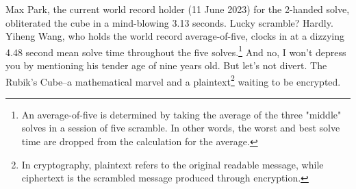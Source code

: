 \documentclass[12pt]{article}
\begin{document}
Max Park, the current world record holder (11 June 2023) for the 2-handed solve, obliterated the cube in a mind-blowing 3.13 seconds. Lucky scramble? Hardly. Yiheng Wang, who holds the world record average-of-five, clocks in at a dizzying 4.48 second mean solve time throughout the five solves.\footnote{An average-of-five is determined by taking the average of the three "middle" solves in a session of five scramble. In other words, the worst and best solve time are dropped from the calculation for the average.} And no, I won't depress you by mentioning his tender age of nine years old. But let's not divert. The Rubik's Cube--a mathematical marvel and a plaintext\footnote{In cryptography, plaintext refers to the original readable message, while ciphertext is the scrambled message produced through encryption.} waiting to be encrypted. \\
\end{document}
